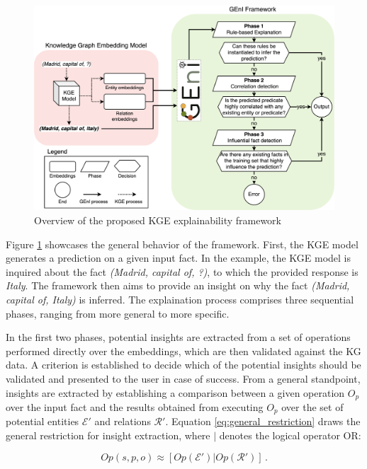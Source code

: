 \begin{figure}[t]
    \centering
    \includegraphics[width=\linewidth]{6_kbsextractiondl/figures/geni_overview.eps}
    \caption{Overview of the proposed KGE explainability framework}
    \label{fig:overview_geni}
\end{figure}

Figure \ref{fig:overview_geni} showcases the general behavior of the framework. First, the KGE model generates a prediction on a given input fact. In the example, the KGE model is inquired about the fact \textit{(Madrid, capital of, ?)}, to which the provided response is \textit{Italy}. The framework then aims to provide an insight on why the fact \textit{(Madrid, capital of, Italy)} is inferred. The explaination process comprises three sequential phases, ranging from more general to more specific. 

In the first two phases, potential insights are extracted from a set of operations performed directly over the embeddings, which are then validated against the KG data. A criterion is established to decide which of the potential insights should be validated and presented to the user in case of success. From a general standpoint, insights are extracted by establishing a comparison between a given operation $O_p$ over the input fact and the results obtained from executing $O_p$ over the set of potential entities $\mathcal{E}'$ and relations $\mathcal{R}'$. Equation \ref{eq:general_restriction} draws the general restriction for insight extraction, where $|$ denotes the logical operator OR:

\begin{equation}\label{eq:general_restriction}
    Op(s,p,o)\approx [Op(\mathcal{E}') | Op(\mathcal{R}')]\,.
\end{equation}

